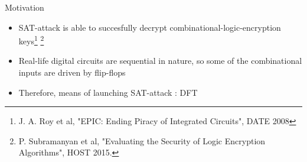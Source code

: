 \begin{frame}{Motivation}
	\begin{itemize}
		\item SAT-attack is able to succesfully decrypt combinational-logic-encryption keys\footnote{J. A. Roy et al, "EPIC: Ending Piracy of Integrated Circuits", DATE 2008} \footnote{P. Subramanyan et al, "Evaluating the Security of Logic Encryption Algorithms", HOST 2015.}
		\item Real-life digital circuits are sequential in nature, so some of the combinational inputs are driven by flip-flops
		\item Therefore, means of launching SAT-attack : DFT 
	\end{itemize}
\end{frame}
